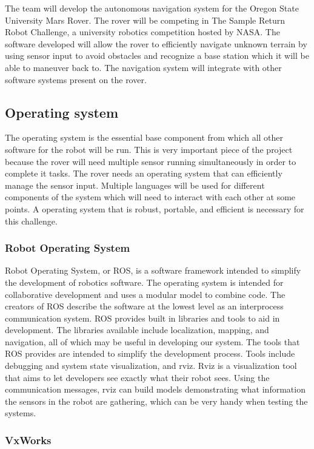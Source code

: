 \documentclass[10pt, oneside,onecolumn]{IEEEtran}
\begin{document}
	The team will develop the autonomous navigation system for the Oregon State University Mars Rover. The rover will be competing in The Sample Return Robot Challenge, a university robotics competition hosted by NASA. The software developed will allow the rover to efficiently navigate unknown terrain by using sensor input to avoid obstacles and recognize a base station which it will be able to maneuver back to. The navigation system will integrate with other software systems present on the rover. 

\subsection{Operating system}

	The operating system is the essential base component from which all other software for the robot will be run. This is very important piece of the project because the rover will need multiple sensor running simultaneously in order to complete it tasks. The rover needs an operating system that can efficiently manage the sensor input. Multiple languages will be used for different components of the system which will need to interact with each other at some points. A operating system that is robust, portable, and efficient is necessary for this challenge.

\subsubsection{Robot Operating System}

Robot Operating System, or ROS, is a software framework intended to simplify the development of robotics software. The operating system is intended for collaborative development and uses a modular model to combine code. The creators of ROS describe the software at the lowest level as an interprocess communication system. ROS provides built in libraries and tools to aid in development. The libraries available include localization, mapping, and navigation, all of which may be useful in developing our system. The tools that ROS provides are intended to simplify the development process. Tools include debugging and system state visualization, and rviz. Rviz is a visualization tool that aims to let developers see exactly what their robot sees. Using the communication messages, rviz can build models demonstrating what information the sensors in the robot are gathering, which can be very handy when testing the systems. 
 
\subsubsection{VxWorks}
\end{document}
